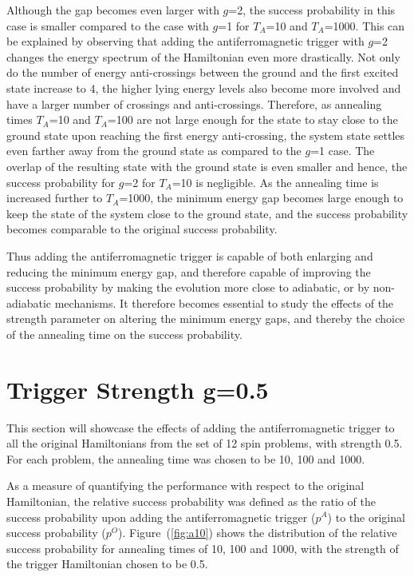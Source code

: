 \documentclass[../main.tex]{subfiles}
\begin{document}
Although the gap becomes even larger with $g$=2, the success probability in this case is smaller compared to the case with $g$=1 for $T_A$=10 and $T_A$=1000. This can be explained by observing that adding the antiferromagnetic trigger with $g$=2 changes the energy spectrum of the Hamiltonian even more drastically. Not only do the number of energy anti-crossings between the ground and the first excited state increase to 4, the higher lying energy levels also become more involved and have a larger number of crossings and anti-crossings. Therefore, as annealing times $T_A$=10 and $T_A$=100 are not large enough for the state to stay close to the ground state upon reaching the first energy anti-crossing, the system state settles even farther away from the ground state as compared to the $g$=1 case. The overlap of the  resulting state with the ground state is even smaller and hence, the success probability for $g$=2 for $T_A$=10 is negligible. As the annealing time is increased further to $T_A$=1000, the minimum energy gap becomes large enough to keep the state of the system close to the ground state, and the success probability becomes comparable to the original success probability.

Thus adding the antiferromagnetic trigger is capable of both enlarging and reducing the minimum energy gap, and therefore capable of improving the success probability by making the evolution more close to adiabatic, or by non-adiabatic mechanisms. It therefore becomes essential to study the effects of the strength parameter on altering the minimum energy gaps, and thereby the choice of the annealing time on the success probability.
 
\section{Trigger Strength g=0.5}
This section will showcase the effects of adding the antiferromagnetic trigger to  all the original Hamiltonians from the set of 12 spin problems, with strength 0.5. For each problem, the annealing time was chosen to be 10, 100 and 1000. 

As a measure of quantifying the performance with respect to the original Hamiltonian, the relative success probability was defined as the ratio of the success probability upon adding the antiferromagnetic trigger ($p^A$) to the original success probability ($p^O$). Figure~(\ref{fig:a10}) shows the distribution of the relative success probability for annealing times of 10, 100 and 1000, with the strength of the trigger Hamiltonian chosen to be 0.5.
\end{document}
